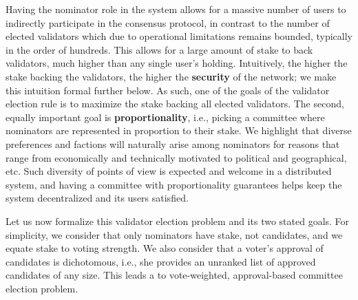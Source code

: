 Having the nominator role in the system allows for a massive number of users to indirectly participate in the consensus protocol, in contrast to the number of elected validators which due to operational limitations remains bounded, typically in the order of hundreds. 
This allows for a large amount of stake to back validators, much higher than any single user's holding. 
Intuitively, the higher the stake backing the validators, the higher the \textbf{security} of the network; we make this intuition formal further below. 
As such, one of the goals of the validator election rule is to maximize the stake backing all elected validators. 
The second, equally important goal is \textbf{proportionality}, i.e., picking a committee where nominators are represented in proportion to their stake. 
We highlight that diverse preferences and factions will naturally arise among nominators for reasons that range from economically and technically motivated to political and geographical, etc. 
Such diversity of points of view is expected and welcome in a distributed system, and having a committee with proportionality guarantees helps keep the system decentralized and its users satisfied.

Let us now formalize this validator election problem and its two stated goals. 
For simplicity, we consider that only nominators have stake, not candidates, and we equate stake to voting strength. We also consider that a voter's approval of candidates is dichotomous, i.e., she provides an unranked list of approved candidates of any size. This leads a to vote-weighted, approval-based committee election problem. 

